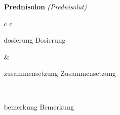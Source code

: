 \documentclass[12pt]{beamer}
\begin{document}
\begin{frame}{
    \textbf{Prednisolon}
    \textit{(Prednisolut)}
}
    \begin{tabular}{c c}
        \begin{beamercolorbox}[wd=\boxwidth\textwidth,ht=\boxheight\textheight,sep=1em]{dosierung}
        Dosierung
        \end{beamercolorbox} & 
        \begin{beamercolorbox}[wd=\boxwidth\textwidth,ht=\boxheight\textheight,sep=1em]{zusammensetzung}
        Zusammensetzung
        \end{beamercolorbox} \\
        \begin{beamercolorbox}[wd=\textwidth,ht=\boxheight\textheight,sep=1em]{bemerkung}
        Bemerkung
        \end{beamercolorbox} \\
    \end{tabular}
\end{frame}
\end{document}

